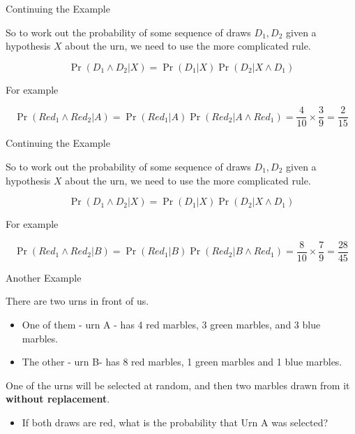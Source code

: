 \documentclass[
  ignorenonframetext,
]{beamer}
\providecommand{\tightlist}{%
  \setlength{\itemsep}{0pt}\setlength{\parskip}{0pt}}
\renewcommand{\,}{\text{, }}
\begin{document}
\begin{frame}{Continuing the Example}
\protect\hypertarget{continuing-the-example}{}

So to work out the probability of some sequence of draws \(D_1, D_2\)
given a hypothesis \(X\) about the urn, we need to use the more
complicated rule.

\[
\Pr(D_1 \wedge D_2 | X) = \Pr(D_1 | X) \Pr(D_2 | X \wedge D_1)
\]

\pause

For example

\[
\Pr(Red_1 \wedge Red_2 | A) = \Pr(Red_1 | A)\Pr(Red_2 | A \wedge Red_1) = \frac{4}{10} \times \frac{3}{9} = \frac{2}{15}
\]

\end{frame}

\begin{frame}{Continuing the Example}
\protect\hypertarget{continuing-the-example-1}{}

So to work out the probability of some sequence of draws \(D_1, D_2\)
given a hypothesis \(X\) about the urn, we need to use the more
complicated rule.

\[
\Pr(D_1 \wedge D_2 | X) = \Pr(D_1 | X) \Pr(D_2 | X \wedge D_1)
\]

For example

\[
\Pr(Red_1 \wedge Red_2 | B) = \Pr(Red_1 | B)\Pr(Red_2 | B \wedge Red_1) = \frac{8}{10} \times \frac{7}{9} = \frac{28}{45}
\]

\end{frame}

\begin{frame}{Another Example}
\protect\hypertarget{another-example-1}{}

There are two urns in front of us.

\begin{itemize}
\tightlist
\item
  One of them - urn A - has 4 red marbles, 3 green marbles, and 3 blue
  marbles.
\item
  The other - urn B- has 8 red marbles, 1 green marbles and 1 blue
  marbles. \pause
\end{itemize}

One of the urns will be selected at random, and then two marbles drawn
from it \textbf{without replacement}.

\begin{itemize}
\tightlist
\item
  If both draws are red, what is the probability that Urn A was
  selected?
\end{itemize}

\end{frame}
\end{document}

